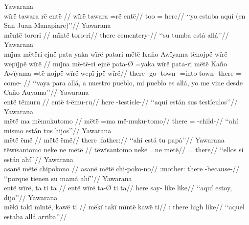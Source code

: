 \documentclass{memoir}
\begin{document}
\pex\label{loc-aff-part-nsubj}    \a Yawarana\\
    \label{histanfo-1}        \begingl
        \glpreamble wïrë tawara rë entë //
        \gla wïrë tawara =rë entë//
        \glb {} too = here//
            \glft ‘‘yo estaba aquí (en San Juan Manapiare)’’//  
        \endgl 
    \a Yawarana\\
    \label{histgrme-3}        \begingl
        \glpreamble mëntë torori //
        \gla mïntë toro-ri//
        \glb there cementery-//
            \glft ‘‘su tumba está allá’’//  
        \endgl 
    \a Yawarana\\
    \label{histgrme-67}        \begingl
        \glpreamble mïjna mëtëri ejnë pata yaka wïrë patari mëtë Kaño Awïyama tënojpë wïrë wepïjpë wïrë //
        \gla mïjna më-të-ri ejnë pata-Ø =yaka wïrë pata-ri mëtë Kaño Awïyama =të-nojpë wïrë wepï-jpë wïrë//
        \glb there -go-  town- =into  town- there   =-  come- //
            \glft ‘‘vaya para allá, a nuestro pueblo, mi pueblo es allá, yo me vine desde Caño Auyama’’//  
        \endgl 
    \a Yawarana\\
    \label{convinsectmaj-33}        \begingl
        \glpreamble entë tëmuru //
        \gla entë t-ëmu-ru//
        \glb here -testicle-//
            \glft ‘‘aquí están sus testículos’’//  
        \endgl 
    \a Yawarana\\
    \label{convamgu-35}        \begingl
        \glpreamble mëtë ma mëmukutomo //
        \gla mëtë =ma më-muku-tomo//
        \glb there = -child-//
            \glft ‘‘ahí mismo están tus hijos’’//  
        \endgl 
    \a Yawarana\\
    \label{convamgu-76}        \begingl
        \glpreamble mëtë ëmë //
        \gla mëtë ëmë//
        \glb there :father://
            \glft ‘‘ahí está tu papá’’//  
        \endgl 
    \a Yawarana\\
    \label{convamgu-89}        \begingl
        \glpreamble tëwïsantomo neke ne mëtë //
        \gla tëwïsantomo neke =ne mëtë//
        \glb {}  = there//
            \glft ‘‘ellos sí están ahí’’//  
        \endgl 
    \a Yawarana\\
    \label{convhistfamsjm-95}        \begingl
        \glpreamble asanë mëtë chipokono //
        \gla asanë mëtë chi-poko-no//
        \glb {}:mother: there -because-//
            \glft ‘‘porque tienen su mamá ahí’’//  
        \endgl 
    \a Yawarana\\
    \label{ctorosq-28}        \begingl
        \glpreamble entë wïrë, ta ti ta //
        \gla entë wïrë ta-Ø ti ta//
        \glb here  say- like like//
            \glft ‘‘aquí estoy, dijo’’//  
        \endgl 
    \a Yawarana\\
    \label{ctovarmafl-366}        \begingl
        \glpreamble mëkï takï mïntë, kawë ti //
        \gla mëkï takï mïntë kawë ti//
        \glb {}:  there high like//
            \glft ‘‘aquel estaba allá arriba’’//  
        \endgl 
\xe
\end{document}
